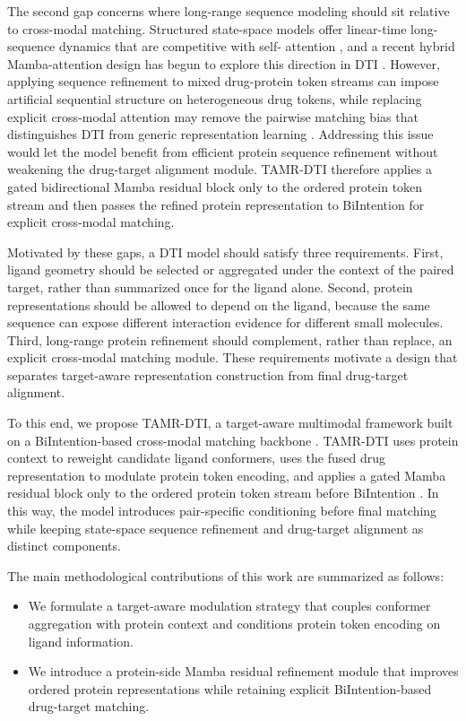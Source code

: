 The second gap concerns where long-range sequence modeling should sit relative to cross-modal matching.
Structured state-space models offer linear-time long-sequence dynamics that are competitive with self-
attention \citep{gu2022s4,gu2023mamba}, and a recent hybrid Mamba-attention design has begun to explore
this direction in DTI \citep{shui2025bimadti}. However, applying sequence refinement to mixed drug-protein
token streams can impose artificial sequential structure on heterogeneous drug tokens, while replacing
explicit cross-modal attention may remove the pairwise matching bias that distinguishes DTI from generic
representation learning \citep{bai2023drugban,peng2024bindti}. Addressing this issue would let the model
benefit from efficient protein sequence refinement without weakening the drug-target alignment module.
TAMR-DTI therefore applies a gated bidirectional Mamba residual block only to the ordered protein token
stream and then passes the refined protein representation to BiIntention for explicit cross-modal matching.

Motivated by these gaps, a DTI model should satisfy three requirements. First, ligand geometry should be
selected or aggregated under the context of the paired target, rather than summarized once for the ligand
alone. Second, protein representations should be allowed to depend on the ligand, because the same sequence
can expose different interaction evidence for different small molecules. Third, long-range protein refinement
should complement, rather than replace, an explicit cross-modal matching module. These requirements
motivate a design that separates target-aware representation construction from final drug-target alignment.

To this end, we propose TAMR-DTI, a target-aware multimodal framework built on a BiIntention-based
cross-modal matching backbone \citep{peng2024bindti}. TAMR-DTI uses protein context to reweight candidate
ligand conformers, uses the fused drug representation to modulate protein token encoding, and applies a
gated Mamba residual block only to the ordered protein token stream before BiIntention
\citep{gu2023mamba}. In this way, the model introduces pair-specific conditioning before final matching
while keeping state-space sequence refinement and drug-target alignment as distinct components.

The main methodological contributions of this work are summarized as follows:
\begin{itemize}
  \item We formulate a target-aware modulation strategy that couples conformer aggregation with protein context and conditions protein token encoding on ligand information.
  \item We introduce a protein-side Mamba residual refinement module that improves ordered protein representations while retaining explicit BiIntention-based drug-target matching.
\end{itemize}


